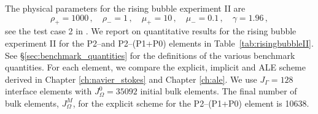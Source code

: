 The physical parameters for the rising bubble experiment II are
\begin{equation} \label{eq:Hysing2}
\rho_+ = 1000\,,\quad \rho_- = 1\,,\quad \mu_+ = 10\,,\quad \mu_- = 0.1\,,\quad
\gamma = 1.96\,,
\end{equation}
see the test case 2 in \cite[Table~I]{HysingTKPBGT09}. We report on
quantitative results for the rising bubble experiment II for the P2--\pdg and
P2--(P1+P0) elements in Table~\ref{tab:risingbubbleII}. See
\S\ref{sec:benchmark_quantities} for the definitions of the various benchmark
quantities. For each element, we compare the explicit, implicit and ALE scheme
derived in Chapter \ref{ch:navier_stokes} and Chapter \ref{ch:ale}. We use
$J_\Gamma=128$ interface elements with $J_\Omega^0=35092$ initial bulk elements.
The final number of bulk elements, $J_\Omega^M$, for the explicit scheme for
the P2--(P1+P0) element is 10638.
